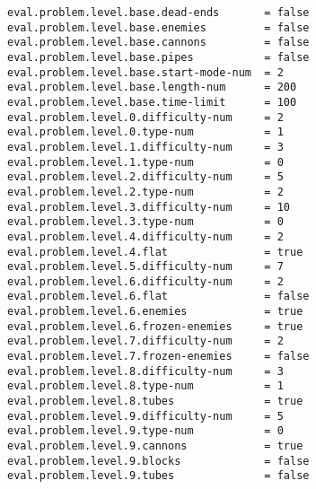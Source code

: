 \begin{appendices}
\begin{minipage}{0.9\linewidth}
\begin{lstlisting}
eval.problem.level.base.dead-ends 		= false
eval.problem.level.base.enemies			= false
eval.problem.level.base.cannons			= false
eval.problem.level.base.pipes			= false
eval.problem.level.base.start-mode-num  = 2
eval.problem.level.base.length-num		= 200
eval.problem.level.base.time-limit		= 100
eval.problem.level.0.difficulty-num		= 2
eval.problem.level.0.type-num			= 1
eval.problem.level.1.difficulty-num		= 3
eval.problem.level.1.type-num			= 0
eval.problem.level.2.difficulty-num		= 5
eval.problem.level.2.type-num			= 2
eval.problem.level.3.difficulty-num		= 10
eval.problem.level.3.type-num			= 0
eval.problem.level.4.difficulty-num		= 2
eval.problem.level.4.flat				= true
eval.problem.level.5.difficulty-num		= 7
eval.problem.level.6.difficulty-num		= 2
eval.problem.level.6.flat				= false
eval.problem.level.6.enemies			= true
eval.problem.level.6.frozen-enemies		= true
eval.problem.level.7.difficulty-num		= 2
eval.problem.level.7.frozen-enemies		= false
eval.problem.level.8.difficulty-num		= 3
eval.problem.level.8.type-num			= 1
eval.problem.level.8.tubes				= true
eval.problem.level.9.difficulty-num		= 5
eval.problem.level.9.type-num			= 0
eval.problem.level.9.cannons			= true
eval.problem.level.9.blocks				= false
eval.problem.level.9.tubes				= false
\end{lstlisting}
\end{minipage}

\end{appendices}